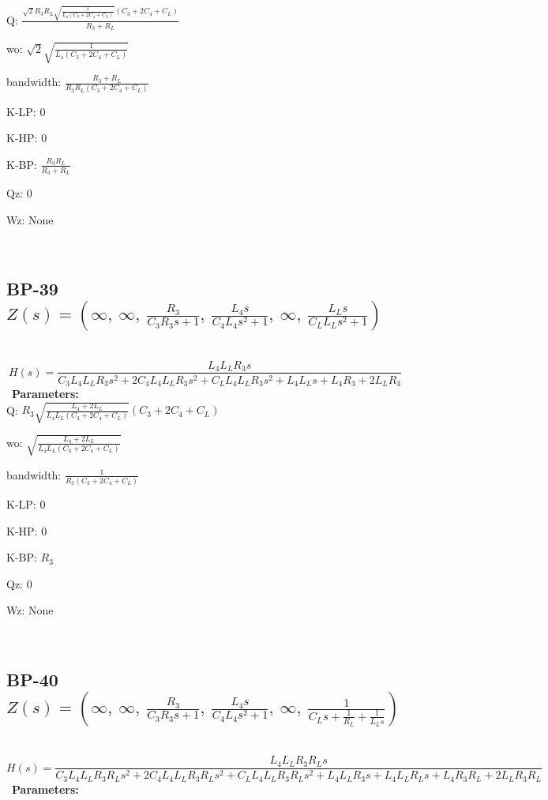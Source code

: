 \documentclass{article}
\begin{document}
Q: $\frac{\sqrt{2} R_{3} R_{L} \sqrt{\frac{1}{L_{4} \left(C_{3} + 2 C_{4} + C_{L}\right)}} \left(C_{3} + 2 C_{4} + C_{L}\right)}{R_{3} + R_{L}}$\ 

wo: $\sqrt{2} \sqrt{\frac{1}{L_{4} \left(C_{3} + 2 C_{4} + C_{L}\right)}}$\ 

bandwidth: $\frac{R_{3} + R_{L}}{R_{3} R_{L} \left(C_{3} + 2 C_{4} + C_{L}\right)}$\ 

K-LP: $0$\ 

K-HP: $0$\ 

K-BP: $\frac{R_{3} R_{L}}{R_{3} + R_{L}}$\ 

Qz: $0$\ 

Wz: $\text{None}$\ 

\ 

\subsection{BP-39 $Z(s) = \left( \infty, \  \infty, \  \frac{R_{3}}{C_{3} R_{3} s + 1}, \  \frac{L_{4} s}{C_{4} L_{4} s^{2} + 1}, \  \infty, \  \frac{L_{L} s}{C_{L} L_{L} s^{2} + 1}\right)$ } \ 
\textbf{\[H(s) = \frac{L_{4} L_{L} R_{3} s}{C_{3} L_{4} L_{L} R_{3} s^{2} + 2 C_{4} L_{4} L_{L} R_{3} s^{2} + C_{L} L_{4} L_{L} R_{3} s^{2} + L_{4} L_{L} s + L_{4} R_{3} + 2 L_{L} R_{3}}\] } \ 
\textbf{Parameters:}\\ 

Q: $R_{3} \sqrt{\frac{L_{4} + 2 L_{L}}{L_{4} L_{L} \left(C_{3} + 2 C_{4} + C_{L}\right)}} \left(C_{3} + 2 C_{4} + C_{L}\right)$\ 

wo: $\sqrt{\frac{L_{4} + 2 L_{L}}{L_{4} L_{L} \left(C_{3} + 2 C_{4} + C_{L}\right)}}$\ 

bandwidth: $\frac{1}{R_{3} \left(C_{3} + 2 C_{4} + C_{L}\right)}$\ 

K-LP: $0$\ 

K-HP: $0$\ 

K-BP: $R_{3}$\ 

Qz: $0$\ 

Wz: $\text{None}$\ 

\ 

\subsection{BP-40 $Z(s) = \left( \infty, \  \infty, \  \frac{R_{3}}{C_{3} R_{3} s + 1}, \  \frac{L_{4} s}{C_{4} L_{4} s^{2} + 1}, \  \infty, \  \frac{1}{C_{L} s + \frac{1}{R_{L}} + \frac{1}{L_{L} s}}\right)$ } \ 
\textbf{\[H(s) = \frac{L_{4} L_{L} R_{3} R_{L} s}{C_{3} L_{4} L_{L} R_{3} R_{L} s^{2} + 2 C_{4} L_{4} L_{L} R_{3} R_{L} s^{2} + C_{L} L_{4} L_{L} R_{3} R_{L} s^{2} + L_{4} L_{L} R_{3} s + L_{4} L_{L} R_{L} s + L_{4} R_{3} R_{L} + 2 L_{L} R_{3} R_{L}}\] } \ 
\textbf{Parameters:}\\ 
\end{document}
